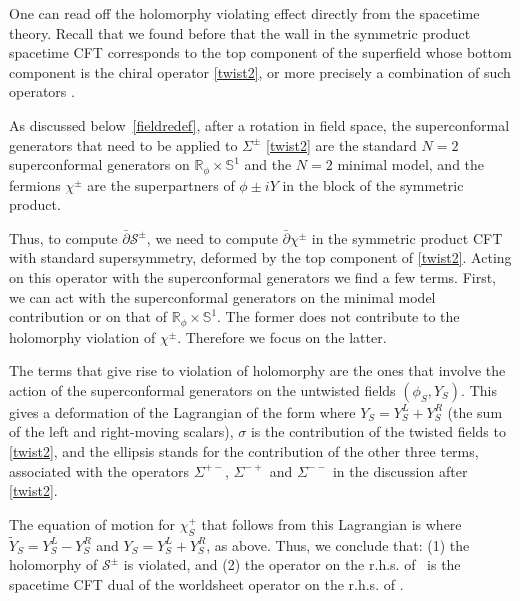 \documentclass[12pt]{article}
\def\LL{{\mathcal{L}}}
\newcommand{\bR}{{\mathbb R}}
\newcommand{\bS}{{\mathbb S}}
\numberwithin{equation}{section}
\def\cS{\mathcal {S}} \def\cT{\mathcal {T}} \def\cU{\mathcal {U}}
\def\LL{{\cal L}}
\def\exp{{\rm exp}}
\begin{document}
One can read off the holomorphy violating effect directly from the spacetime theory. Recall that we found before that the wall in the symmetric product spacetime CFT corresponds to the top component of the superfield whose bottom component is the chiral operator \eqref{twist2}, or more precisely a combination of such operators \BPSsum. 

As discussed below~\eqref{fieldredef}, after a rotation in field space, the superconformal generators that need to be applied to $\Sigma^\pm$ \eqref{twist2} are the standard $N=2$ superconformal generators on $\bR_\phi\times \bS^1$ and the $N=2$ minimal model, and the fermions $\chi^\pm$ are the superpartners of $\phi\pm iY$ in the block of the symmetric product. 


Thus, to compute $\bar\partial\cS^\pm$, we need to compute $\bar\partial\chi^\pm$ in the symmetric product CFT with standard supersymmetry, deformed by the top component of \eqref{twist2}. Acting on this operator with the superconformal generators we find a few terms. First, we can act with the superconformal generators on the minimal model contribution or on that of $\bR_\phi\times \bS^1$. The former does not contribute to the holomorphy violation of $\chi^\pm$. Therefore we focus on the latter. 

The terms that give rise to violation of holomorphy are the ones that involve the action of the superconformal generators on the untwisted fields $(\phi_S, Y_S)$. This gives a deformation of the Lagrangian of the form 
\eqn[deformL]{
\delta\LL=\chi_S^+\bar\chi_S^+\,\exp\Big[ -\frac{1}{2\sqrt{k}}\big( \phi_S - iY_S\big) \Big]\,\sigma+\cdots~,
}
where $Y_S=Y_S^L+Y_S^R$ (the sum of the left and right-moving scalars), $\sigma$ is the contribution of the twisted fields to \eqref{twist2}, and the ellipsis stands for the contribution of the other three terms, associated with the operators $\Sigma^{+-}$, $\Sigma^{-+}$ and $\Sigma^{--}$ in the discussion after \eqref{twist2}.  

The equation of motion for $\chi_S^+$ that follows from this Lagrangian is 
\eqn[deformeomS]{\bar\partial\chi_S^+=
\bar\chi_S^+\,\exp\Big[ -\frac{1}{2\sqrt{k}}\big( \phi_S + i\widetilde Y_S\big) \Big]\sigma
+\bar\chi_S^-\,\exp\Big[ -\frac{1}{2\sqrt{k}}\big( \phi_S + i Y_S\big) \Big]\sigma~,
}
where $\widetilde Y_S=Y_S^L-Y_S^R$ and $Y_S=Y_S^L+Y_S^R$, as above. Thus, we conclude that: (1) the holomorphy of $\cS^\pm$ is violated, and (2) the operator on the r.h.s. of \ is the spacetime CFT dual of the worldsheet operator on the r.h.s. of \Sholoviol. 
\end{document}
